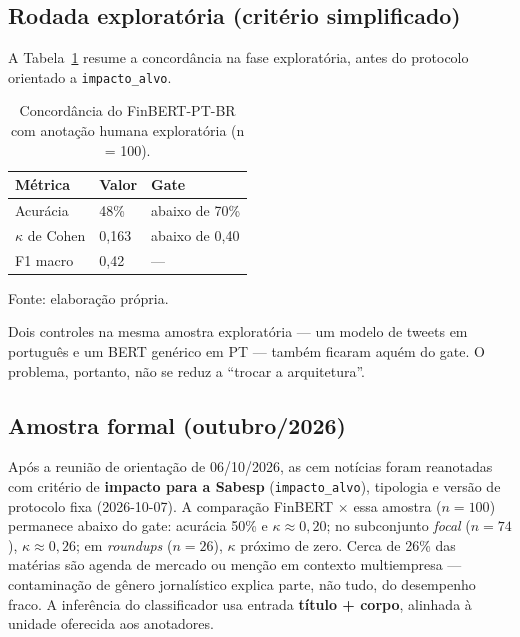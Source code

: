 \subsection{Rodada exploratória (critério simplificado)}

A Tabela~\ref{tab:kappa} resume a concordância na fase exploratória, antes do protocolo orientado a \texttt{impacto\_alvo}.

\begin{table}[htbp]
\caption{Concordância do FinBERT-PT-BR com anotação humana exploratória (n = 100).}
\label{tab:kappa}
\begin{tabular}{|p{}|p{}|p{}|}
\hline
\textbf{Métrica} & \textbf{Valor} & \textbf{Gate} \\
\hline
Acurácia & 48\% & abaixo de 70\% \\
\hline
$\kappa$ de Cohen & 0,163 & abaixo de 0,40 \\
\hline
F1 macro & 0,42 & --- \\
\hline
\end{tabular}

\vspace{0.4em}
{\footnotesize Fonte: elaboração própria.}

\end{table}

Dois controles na mesma amostra exploratória --- um modelo de tweets em português e um BERT genérico em PT \cite{souza2020bertimbau} --- também ficaram aquém do gate. O problema, portanto, não se reduz a ``trocar a arquitetura''.

\subsection{Amostra formal (outubro/2026)}

Após a reunião de orientação de 06/10/2026, as cem notícias foram reanotadas com critério de \textbf{impacto para a Sabesp} (\texttt{impacto\_alvo}), tipologia e versão de protocolo fixa (2026-10-07). A comparação FinBERT $\times$ essa amostra ($n=100$) permanece abaixo do gate: acurácia 50\% e $\kappa \approx 0{,}20$; no subconjunto \emph{focal} ($n=74$), $\kappa \approx 0{,}26$; em \emph{roundups} ($n=26$), $\kappa$ próximo de zero. Cerca de 26\% das matérias são agenda de mercado ou menção em contexto multiempresa --- contaminação de gênero jornalístico explica parte, não tudo, do desempenho fraco. A inferência do classificador usa entrada \textbf{título + corpo}, alinhada à unidade oferecida aos anotadores.

